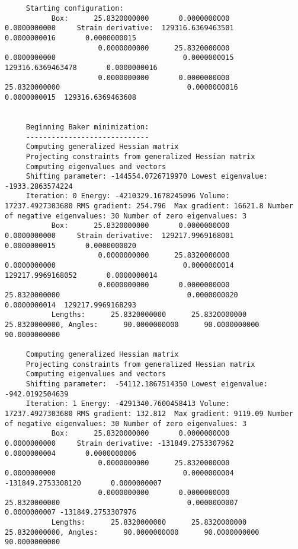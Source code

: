 \begin{tiny}
\begin{verbatim}
     Starting configuration:
           Box:      25.8320000000       0.0000000000       0.0000000000     Strain derivative:  129316.6369463501       0.0000000016       0.0000000015
                      0.0000000000      25.8320000000       0.0000000000                              0.0000000015  129316.6369463478       0.0000000016
                      0.0000000000       0.0000000000      25.8320000000                              0.0000000016       0.0000000015  129316.6369463608


     Beginning Baker minimization:
     -----------------------------
     Computing generalized Hessian matrix
     Projecting constraints from generalized Hessian matrix
     Computing eigenvalues and vectors
     Shifting parameter: -144554.0726719970 Lowest eigenvalue:   -1933.2863574224
     Iteration: 0 Energy: -4210329.1678245096 Volume:   17237.4927303680 RMS gradient: 254.796  Max gradient: 16621.8 Number of negative eigenvalues: 30 Number of zero eigenvalues: 3
           Box:      25.8320000000       0.0000000000       0.0000000000     Strain derivative:  129217.9969168001       0.0000000015       0.0000000020
                      0.0000000000      25.8320000000       0.0000000000                              0.0000000014  129217.9969168052       0.0000000014
                      0.0000000000       0.0000000000      25.8320000000                              0.0000000020       0.0000000014  129217.9969168293
           Lengths:      25.8320000000      25.8320000000      25.8320000000, Angles:      90.0000000000      90.0000000000      90.0000000000

     Computing generalized Hessian matrix
     Projecting constraints from generalized Hessian matrix
     Computing eigenvalues and vectors
     Shifting parameter:  -54112.1867514350 Lowest eigenvalue:    -942.0192504639
     Iteration: 1 Energy: -4291340.7600458413 Volume:   17237.4927303680 RMS gradient: 132.812  Max gradient: 9119.09 Number of negative eigenvalues: 30 Number of zero eigenvalues: 3
           Box:      25.8320000000       0.0000000000       0.0000000000     Strain derivative: -131849.2753307962       0.0000000004       0.0000000006
                      0.0000000000      25.8320000000       0.0000000000                              0.0000000004 -131849.2753308120       0.0000000007
                      0.0000000000       0.0000000000      25.8320000000                              0.0000000007       0.0000000007 -131849.2753307976
           Lengths:      25.8320000000      25.8320000000      25.8320000000, Angles:      90.0000000000      90.0000000000      90.0000000000


\end{verbatim}
\end{tiny}
